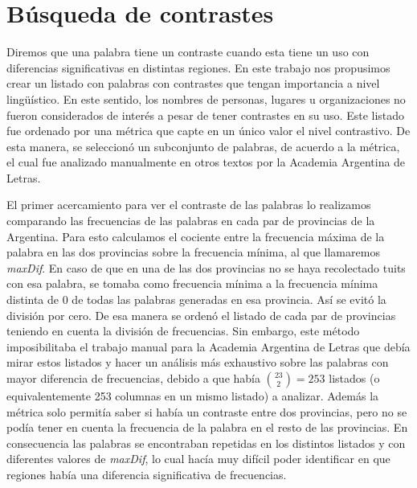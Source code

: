 

\section{Búsqueda de contrastes}

Diremos que una palabra tiene un contraste cuando esta tiene un uso con diferencias significativas en
distintas regiones. En este trabajo nos propusimos crear un listado con palabras con contrastes que tengan
importancia a nivel lingüístico. En este sentido, los nombres de personas, lugares u organizaciones no 
fueron considerados de interés a pesar de tener contrastes en su uso.
Este listado fue ordenado por una métrica que capte en un único valor el nivel contrastivo. De esta manera, 
se seleccionó un subconjunto de palabras, de acuerdo a la métrica, el cual fue analizado manualmente en otros textos por la Academia Argentina de Letras.

El primer acercamiento para ver el contraste de las palabras lo realizamos comparando las frecuencias de las palabras 
en cada par de provincias de la Argentina. Para esto calculamos el cociente entre la frecuencia máxima de la palabra
en las dos provincias sobre la frecuencia mínima, al que llamaremos \textit{maxDif}. En caso de que en una de las dos provincias no se haya 
recolectado tuits con esa palabra, se tomaba como frecuencia mínima a la frecuencia mínima distinta de 0 de todas las palabras generadas en esa provincia. Así se evitó la división por cero.
De esa manera se ordenó el listado de cada par de provincias teniendo en cuenta la división de frecuencias. 
Sin embargo, este método imposibilitaba el trabajo manual para la Academia Argentina de Letras que debía mirar estos listados y hacer un análisis más exhaustivo sobre las palabras con mayor diferencia de frecuencias, debido a que había $\binom{23}{2} = 253$
listados (o equivalentemente 253 columnas en un mismo listado) a analizar. Además la métrica solo permitía saber si había un contraste entre dos provincias, pero no se podía tener en cuenta la frecuencia de la palabra en el resto de las provincias. 
En consecuencia las palabras se encontraban repetidas en los distintos listados y con diferentes valores de \textit{maxDif}, lo cual hacía muy difícil poder identificar en que regiones había una diferencia significativa de frecuencias.

